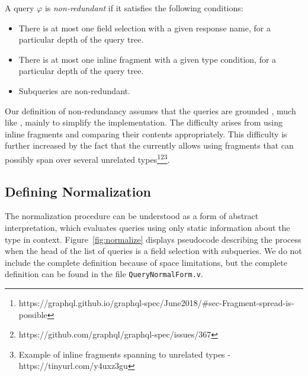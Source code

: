 \begin{definition}
A \gql query $\varphi$ is \textit{non-redundant} if it satisfies the following conditions:
\begin{itemize}
    \item There is at most one field selection with a given response name, for a particular depth of the query tree.

    \item There is at most one inline fragment with a given type condition, for a particular depth of the query tree.
    
    \item Subqueries are non-redundant.
\end{itemize}
\end{definition}

Our definition of non-redundancy assumes that the queries are grounded , much like \HP, mainly to simplify the implementation. The difficulty arises from using inline fragments and comparing their contents appropriately. This difficulty is further increased by the fact that the \spec currently allows using fragments that can possibly span over several unrelated types\footnote{https://graphql.github.io/graphql-spec/June2018/\#sec-Fragment-spread-is-possible}\footnote{https://github.com/graphql/graphql-spec/issues/367}\footnote{Example of inline fragments spanning to unrelated types - https://tinyurl.com/y4uxz3gu}.

\subsection{Defining Normalization}\label{subsec:normalization}

The normalization procedure can be understood as a form of abstract interpretation, which evaluates queries using only static information about the type in context. Figure~\ref{fig:normalize} displays pseudocode describing the process when the head of the list of queries is a field selection with subqueries. We do not include the complete definition because of space limitations, but the complete definition can be found in the file \texttt{QueryNormalForm.v}.


